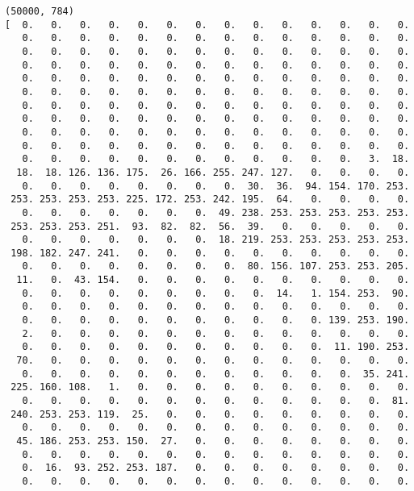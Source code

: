 \documentclass[11pt]{article}
\begin{document}
    \begin{Verbatim}[commandchars=\\\{\}]
(50000, 784)
[  0.   0.   0.   0.   0.   0.   0.   0.   0.   0.   0.   0.   0.   0.
   0.   0.   0.   0.   0.   0.   0.   0.   0.   0.   0.   0.   0.   0.
   0.   0.   0.   0.   0.   0.   0.   0.   0.   0.   0.   0.   0.   0.
   0.   0.   0.   0.   0.   0.   0.   0.   0.   0.   0.   0.   0.   0.
   0.   0.   0.   0.   0.   0.   0.   0.   0.   0.   0.   0.   0.   0.
   0.   0.   0.   0.   0.   0.   0.   0.   0.   0.   0.   0.   0.   0.
   0.   0.   0.   0.   0.   0.   0.   0.   0.   0.   0.   0.   0.   0.
   0.   0.   0.   0.   0.   0.   0.   0.   0.   0.   0.   0.   0.   0.
   0.   0.   0.   0.   0.   0.   0.   0.   0.   0.   0.   0.   0.   0.
   0.   0.   0.   0.   0.   0.   0.   0.   0.   0.   0.   0.   0.   0.
   0.   0.   0.   0.   0.   0.   0.   0.   0.   0.   0.   0.   3.  18.
  18.  18. 126. 136. 175.  26. 166. 255. 247. 127.   0.   0.   0.   0.
   0.   0.   0.   0.   0.   0.   0.   0.  30.  36.  94. 154. 170. 253.
 253. 253. 253. 253. 225. 172. 253. 242. 195.  64.   0.   0.   0.   0.
   0.   0.   0.   0.   0.   0.   0.  49. 238. 253. 253. 253. 253. 253.
 253. 253. 253. 251.  93.  82.  82.  56.  39.   0.   0.   0.   0.   0.
   0.   0.   0.   0.   0.   0.   0.  18. 219. 253. 253. 253. 253. 253.
 198. 182. 247. 241.   0.   0.   0.   0.   0.   0.   0.   0.   0.   0.
   0.   0.   0.   0.   0.   0.   0.   0.  80. 156. 107. 253. 253. 205.
  11.   0.  43. 154.   0.   0.   0.   0.   0.   0.   0.   0.   0.   0.
   0.   0.   0.   0.   0.   0.   0.   0.   0.  14.   1. 154. 253.  90.
   0.   0.   0.   0.   0.   0.   0.   0.   0.   0.   0.   0.   0.   0.
   0.   0.   0.   0.   0.   0.   0.   0.   0.   0.   0. 139. 253. 190.
   2.   0.   0.   0.   0.   0.   0.   0.   0.   0.   0.   0.   0.   0.
   0.   0.   0.   0.   0.   0.   0.   0.   0.   0.   0.  11. 190. 253.
  70.   0.   0.   0.   0.   0.   0.   0.   0.   0.   0.   0.   0.   0.
   0.   0.   0.   0.   0.   0.   0.   0.   0.   0.   0.   0.  35. 241.
 225. 160. 108.   1.   0.   0.   0.   0.   0.   0.   0.   0.   0.   0.
   0.   0.   0.   0.   0.   0.   0.   0.   0.   0.   0.   0.   0.  81.
 240. 253. 253. 119.  25.   0.   0.   0.   0.   0.   0.   0.   0.   0.
   0.   0.   0.   0.   0.   0.   0.   0.   0.   0.   0.   0.   0.   0.
  45. 186. 253. 253. 150.  27.   0.   0.   0.   0.   0.   0.   0.   0.
   0.   0.   0.   0.   0.   0.   0.   0.   0.   0.   0.   0.   0.   0.
   0.  16.  93. 252. 253. 187.   0.   0.   0.   0.   0.   0.   0.   0.
   0.   0.   0.   0.   0.   0.   0.   0.   0.   0.   0.   0.   0.   0.

\end{Verbatim}
\end{document}
